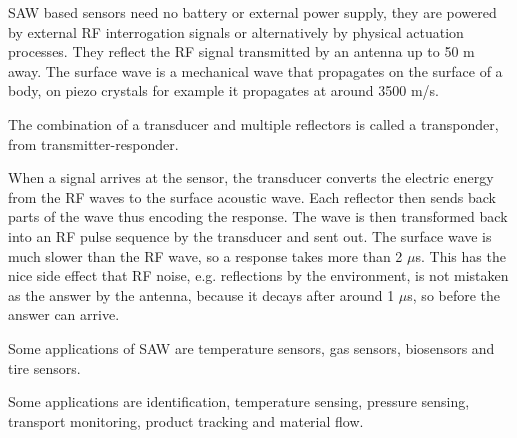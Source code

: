 \begin{mytitle} SAW based sensors need no battery or external power supply, they are powered by external RF interrogation signals or alternatively by physical actuation processes. They reflect the RF signal transmitted by an antenna up to 50 m away. The surface wave is a mechanical wave that propagates on the surface of a body, on piezo crystals for example it propagates at around 3500 m/s.
    \begin{mysubtitle} The combination of a transducer and multiple reflectors is called a transponder, from transmitter-responder.
    \end{mysubtitle}
    \begin{mysubtitle} When a signal arrives at the sensor, the transducer converts the electric energy from the RF waves to the surface acoustic wave. Each reflector then sends back parts of the wave thus encoding the response. The wave is then transformed back into an RF pulse sequence by the transducer and sent out. The surface wave is much slower than the RF wave, so a response takes more than 2 $\mu$s. This has the nice side effect that RF noise, e.g. reflections by the environment, is not mistaken as the answer by the antenna, because it decays after around 1 $\mu$s, so before the answer can arrive.
    \end{mysubtitle}
\end{mytitle}
\begin{mytitle}[Applications]
    \begin{mysubtitle} Some applications of SAW are temperature sensors, gas sensors, biosensors and tire sensors.
    \end{mysubtitle}
    \begin{mysubtitle} Some applications are identification, temperature sensing, pressure sensing, transport monitoring, product tracking and material flow.
    \end{mysubtitle}
\end{mytitle}


